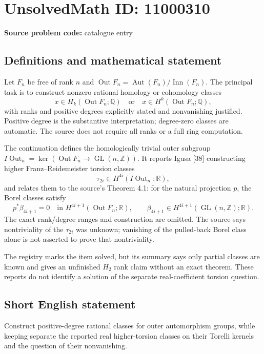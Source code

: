 \documentclass[11pt]{article}
\newcommand{\Z}{\mathbb{Z}}
\newcommand{\Q}{\mathbb{Q}}
\newcommand{\R}{\mathbb{R}}
\begin{document}
\section*{UnsolvedMath ID: 11000310}
\textbf{Source problem code:} catalogue entry
\subsection{Definitions and mathematical statement}
Let \(F_n\) be free of rank \(n\) and \(\operatorname{Out}F_n=\operatorname{Aut}(F_n)/\operatorname{Inn}(F_n)\). The principal task is to construct nonzero rational homology or cohomology classes
\[
 x\in H_k(\operatorname{Out}F_n;\Q)
 \quad\text{or}\quad
 x\in H^k(\operatorname{Out}F_n;\Q),
\]
with ranks and positive degrees explicitly stated and nonvanishing justified. Positive degree is the substantive interpretation; degree-zero classes are automatic. The source does not require all ranks or a full ring computation.

The continuation defines the homologically trivial outer subgroup
\(I\operatorname{Out}_n=\ker(\operatorname{Out}F_n\to\operatorname{GL}(n,\Z))\).
It reports Igusa [38] constructing higher Franz--Reidemeister torsion classes
\[
 \tau_{2i}\in H^{4i}(I\operatorname{Out}_n;\R),
\]
and relates them to the source's Theorem 4.1: for the natural projection \(p\), the Borel classes satisfy
\[
 p^*\beta_{4i+1}=0\quad\text{in }H^{4i+1}(\operatorname{Out}F_n;\R),
 \qquad\beta_{4i+1}\in H^{4i+1}(\operatorname{GL}(n,\Z);\R).
\]
The exact rank/degree ranges and construction are omitted. The source says nontriviality of the \(\tau_{2i}\) was unknown; vanishing of the pulled-back Borel class alone is not asserted to prove that nontriviality.

The registry marks the item solved, but its summary says only partial classes are known and gives an unfinished \(H_2\) rank claim without an exact theorem. These reports do not identify a solution of the separate real-coefficient torsion question.
\subsection{Short English statement}
Construct positive-degree rational classes for outer automorphism groups, while keeping separate the reported real higher-torsion classes on their Torelli kernels and the question of their nonvanishing.
\end{document}
